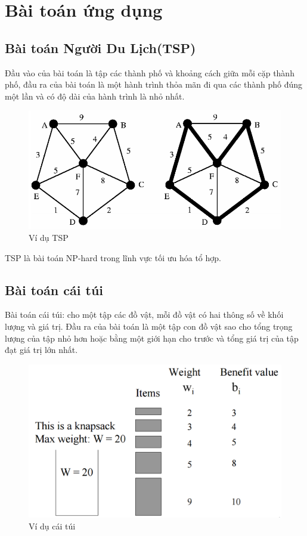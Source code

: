 \documentclass[a4paper,12pt]{report}
\begin{document}
\section{Bài toán ứng dụng}
\subsection{Bài toán Người Du Lịch(TSP)}
Đầu vào của bài toán là tập các thành phố và khoảng cách giữa mỗi cặp thành phố, đầu ra của bài toán là một hành trình thỏa mãn đi qua các thành phố đúng một lần và có độ dài của hành trình là nhỏ nhất.\\

\begin{figure}[H]
\center
\includegraphics[scale=0.5]{TSP_example.PNG}
\caption{Ví dụ TSP}
\end{figure}

TSP là bài toán NP-hard trong lĩnh vực tối ưu hóa tổ hợp.
\subsection{Bài toán cái túi}
Bài toán cái túi: cho một tập các đồ vật, mỗi đồ vật có hai thông số về khối lượng và giá trị. Đầu ra của bài toán là một tập con đồ vật sao cho tổng trọng lượng của tập nhỏ hơn hoặc bằng một giới hạn cho trước và tổng giá trị của tập đạt giá trị lớn nhất.
\begin{figure}[H]
\center
\includegraphics[scale=0.5]{KP_example.PNG}
\caption{Ví dụ cái túi}
\end{figure}
\end{document}

